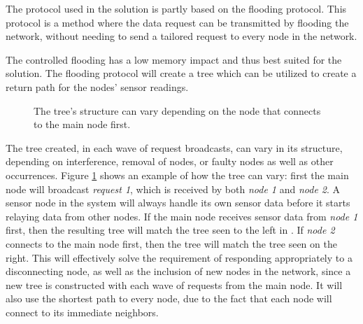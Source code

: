 The protocol used in the solution is partly based on the flooding protocol.
This protocol is a method where the data request can be transmitted by flooding the network, without needing to send a tailored request to every node in the network. 

The controlled flooding has a low memory impact and thus best suited for the solution. The flooding protocol will create a tree which can be utilized to create a return path for the nodes' sensor readings.

\begin{figure}[h!]
	\centering
	\caption{The tree's structure can vary depending on the node that connects to the main node first.}
	\label{fig:treeVariation}
\end{figure}


The tree created, in each wave of request broadcasts, can vary in its structure, depending on interference, removal of nodes, or faulty nodes as well as other occurrences. Figure \ref{fig:treeVariation} shows an example of how the tree can vary: first the main node will broadcast \textit{request 1}, which is received by both \textit{node 1} and \textit{node 2}. A sensor node in the system will always handle its own sensor data before it starts relaying data from other nodes. If the main node receives sensor data from \textit{node 1} first, then the resulting tree will match the tree seen to the left in . If \textit{node 2} connects to the main node first, then the tree will match the tree seen on the right.
This will effectively solve the requirement of responding appropriately to a disconnecting node, as well as the inclusion of new nodes in the network, since a new tree is constructed with each wave of requests from the main node.
It will also use the shortest path to every node, due to the fact that each node will connect to its immediate neighbors.

